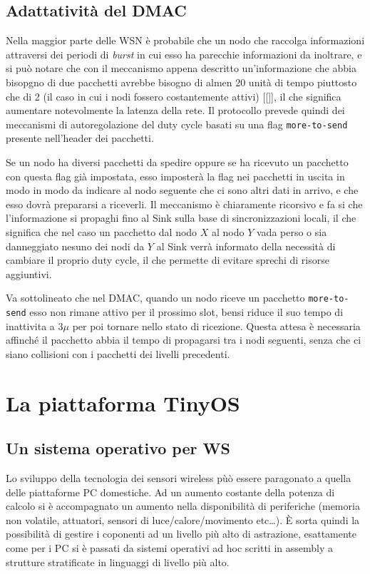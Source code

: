 \documentclass[pdftex,12pt,a4paper,italian,openany]{book}
\begin{document}
\section{Adattatività del DMAC}
Nella maggior parte delle WSN è probabile che un nodo che raccolga informazioni attraversi dei
periodi di \emph{burst} in cui esso ha parecchie informazioni da inoltrare, e si può notare che 
con il meccanismo appena descritto un'informazione che abbia bisopgno di due pacchetti avrebbe 
bisogno di almen 20 unità di tempo piuttosto che di 2 (il caso in cui i nodi fossero 
costantemente attivi) [[]], il che significa aumentare notevolmente la latenza della rete. 
Il protocollo prevede quindi dei meccanismi di autoregolazione del duty cycle basati su una flag 
\texttt{more-to-send} presente nell'header dei pacchetti.

Se un nodo ha diversi pacchetti da spedire oppure se ha ricevuto un pacchetto con questa flag
già impostata, esso imposterà la flag nei pacchetti in uscita in modo in modo da indicare al 
nodo seguente che ci sono altri dati in arrivo, e che esso dovrà prepararsi a riceverli. 
Il meccanismo è chiaramente ricorsivo e fa si che l'informazione si propaghi fino al Sink 
sulla base di sincronizzazioni locali, il che significa che nel caso un pacchetto dal nodo $X$ 
al nodo $Y$ vada perso o sia danneggiato nesuno dei nodi da $Y$ al Sink verrà informato della necessità di  cambiare il proprio duty cycle, il che permette di evitare sprechi di risorse 
aggiuntivi.

Va sottolineato che nel DMAC, quando un nodo riceve un pacchetto \texttt{more-to-send} esso non 
rimane attivo per il prossimo slot, bensi riduce il suo tempo di inattivita a $3\mu$ per poi tornare nello stato di ricezione. Questa attesa è necessaria affinché il pacchetto abbia il tempo di propagarsi tra i nodi seguenti, senza che ci siano collisioni con i pacchetti dei livelli precedenti. 


\chapter{La piattaforma TinyOS}

\section{Un sistema operativo per WS}
Lo sviluppo della tecnologia dei sensori wireless pùò essere paragonato a quella delle 
piattaforme PC domestiche. Ad un aumento costante della potenza di calcolo si è accompagnato un 
aumento nella disponibilità di periferiche (memoria non volatile, attuatori, sensori di 
luce/calore/movimento etc\ldots). \`E sorta quindi la possibilità di gestire i coponenti ad un 
livello più alto di astrazione, esattamente come per i PC si è passati da sistemi operativi 
ad hoc scritti in assembly a strutture stratificate in linguaggi di livello più alto. 
\end{document}

